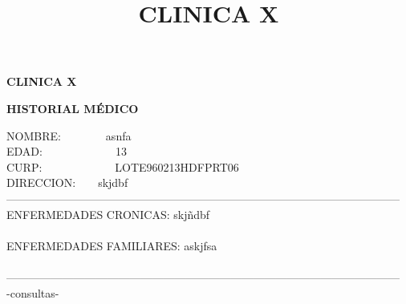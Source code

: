 \documentclass[10pt,a4paper]{letter}
\title{\bf CLINICA X}
\begin{document}
\begin{center}
{\scshape\LARGE \bf CLINICA X\par}
{\bf HISTORIAL MÉDICO\\}
\end{center}
NOMBRE:\ \ \ \ \ \ \ \ asnfa\\
EDAD:\ \ \ \ \ \ \ \ \ \ \ \ \ 13\\
CURP:\ \ \ \ \ \ \ \ \ \ \ \ \ LOTE960213HDFPRT06 \\
DIRECCION:\ \ \ \ skjdbf\\
--------------------------------------------------------------------------------------------------------- \\
ENFERMEDADES CRONICAS: skjñdbf\\ \\
ENFERMEDADES FAMILIARES: askjfsa \\ \\
--------------------------------------------------------------------------------------------------------- \\-consultas-
\end{document}
